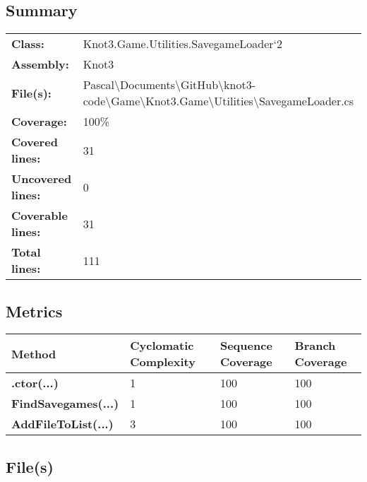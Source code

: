 \documentclass[a4paper,10pt]{article}
\begin{document}
\subsection{Summary}
\begin{longtable}[l]{ll}
\textbf{Class:} & Knot3.Game.Utilities.SavegameLoader`2\\
\textbf{Assembly:} & Knot3\\
\textbf{File(s):} & \begin{minipage}[t]{12cm}{Pascal\textbackslash Documents\textbackslash GitHub\textbackslash knot3-code\textbackslash Game\textbackslash Knot3.Game\textbackslash Utilities\textbackslash SavegameLoader.cs}\end{minipage} \\
\textbf{Coverage:} & 100\%\\
\textbf{Covered lines:} & 31\\
\textbf{Uncovered lines:} & 0\\
\textbf{Coverable lines:} & 31\\
\textbf{Total lines:} & 111\\
\end{longtable}
\subsection{Metrics}
\begin{longtable}[l]{|l|l|l|l|}
\hline
\textbf{Method} & \textbf{Cyclomatic Complexity} & \textbf{Sequence Coverage} & \textbf{Branch Coverage}\\
\hline
\textbf{.ctor(...)} & 1 & 100 & 100\\
\hline
\textbf{FindSavegames(...)} & 1 & 100 & 100\\
\hline
\textbf{AddFileToList(...)} & 3 & 100 & 100\\
\hline
\end{longtable}
\subsection{File(s)}
\end{document}
